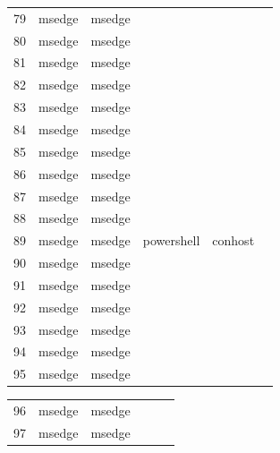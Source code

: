 \documentclass[a4paper,twoside,12pt]{book}
\begin{document}
\begin{appendices}
\begin{table}
\begin{tabular}{l|l|l|l|l|l}
		79  &  msedge &         msedge &                &                &                \\
		80  &  msedge &         msedge &                &                &                \\
		81  &  msedge &         msedge &                &                &                \\
		82  &  msedge &         msedge &                &                &                \\
		83  &  msedge &         msedge &                &                &                \\
		84  &  msedge &         msedge &                &                &                \\
		85  &  msedge &         msedge &                &                &                \\
		86  &  msedge &         msedge &                &                &                \\
		87  &  msedge &         msedge &                &                &                \\
		88  &  msedge &         msedge &                &                &                \\
		89  &  msedge &         msedge &     powershell &        conhost &                \\
		90  &  msedge &         msedge &                &                &                \\
		91  &  msedge &         msedge &                &                &                \\
		92  &  msedge &         msedge &                &                &                \\
		93  &  msedge &         msedge &                &                &                \\
		94  &  msedge &         msedge &                &                &                \\
		95  &  msedge &         msedge &                &                &                \\
		\bottomrule
	\end{tabular}		
\end{table}
\begin{table}
	\centering
	\begin{tabular}{l|l|l|l|l|l}
		\toprule
		96  &  msedge &         msedge &                &                &                \\
		97  &  msedge &         msedge &                &                &                \\

\end{tabular}
\end{table}
\end{appendices}
\end{document}
